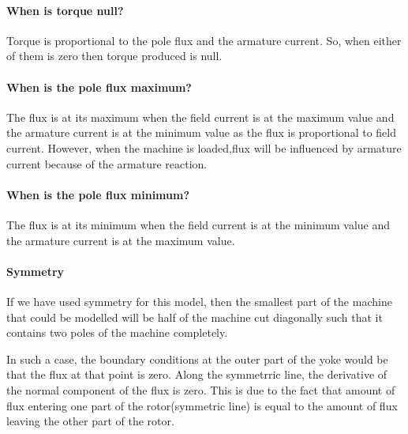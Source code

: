 \documentclass[a4paper,11pt]{article}
\begin{document}
\paragraph{When is torque null?}
Torque is proportional to the pole flux and the armature current. So, when either of them is zero then torque produced is null.

\paragraph{When is the pole flux maximum?}
The flux is at its maximum when the field current is at the maximum value and the armature current is at the minimum value as the flux is proportional to field current. However, when the machine is loaded,flux will be influenced by armature current because of the armature reaction.

\paragraph{When is the pole flux minimum?}
The flux is at its minimum when the field current is at the minimum value and the armature current is at the maximum value.

\paragraph{Symmetry}
If we have used symmetry for this model, then the smallest part of the machine that could be modelled will be half of the machine cut diagonally such that it contains two poles of the machine completely.

In such a case, the boundary conditions at the outer part of the yoke would be that the flux at that point is zero. Along the symmetrric line, the derivative of the normal component of the flux is zero. This is due to the fact that amount of flux entering one part of the rotor(symmetric line) is equal to the amount of flux leaving the other part of the rotor.
\end{document}
